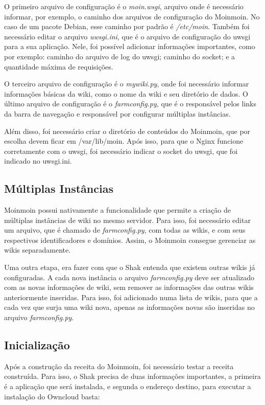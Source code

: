 O primeiro arquivo de configuração é o \textit{moin.wsgi}, arquivo onde é necessário
informar, por exemplo, o caminho dos arquivos de configuração do Moinmoin. No caso
de um pacote Debian, esse caminho por padrão é  \textit{/etc/moin}. Também foi necessário 
editar o arquivo \textit{uwsgi.ini}, que é o arquivo de configuração
do uwsgi para a sua aplicação. Nele, foi possível adicionar informações importantes, como
por exemplo: caminho do arquivo de log do uwsgi; caminho do socket;
e a quantidade máxima de requisições.

O terceiro arquivo de configuração é o \textit{mywiki.py}, onde foi necessário
informar informações básicas da wiki, como o nome da wiki e seu diretório de dados. 
O último arquivo de configuração é o \textit{farmconfig.py}, que é o responsável pelos 
links da barra de navegação e responsável por configurar múltiplas instâncias.

Além disso, foi necessário criar o diretório de conteúdos do Moinmoin, que por
escolha devem ficar em /var/lib/moin. Após isso, para que o Nginx funcione corretamente
com o uwsgi, foi necessário indicar o socket do uwsgi, que foi indicado no uwsgi.ini.

\subsection{Múltiplas Instâncias}

Moinmoin possui nativamente a funcionalidade que permite a criação de múltiplas 
instâncias de wiki no mesmo servidor. Para isso, foi necessário editar um arquivo,
que é chamado de \textit{farmconfig.py}, com todas as wikis, e com seus 
respectivos identificadores e domínios. Assim, o Moinmoin consegue gerenciar as 
wikis separadamente. 

Uma outra etapa, era fazer com que o Shak entenda que existem outras wikis já 
configuradas. A cada nova instância
o arquivo \textit{farmconfig.py} deve ser atualizado com as novas 
informações de wiki, sem remover as
informações das outras wikis anteriormente inseridas. Para isso, foi adicionado
numa lista de wikis, para que a cada vez que surja uma wiki nova, apenas as
informações novas são inseridas no arquivo \textit{farmconfig.py}.

\subsection{Inicialização}

Após a construção da receita do Moinmoin, foi necessário testar a receita construída. Para 
isso, o Shak precisa de duas informações importantes, a primeira é a aplicação
que será instalada, e segunda o endereço destino, para executar a instalação
do Owncloud basta:

